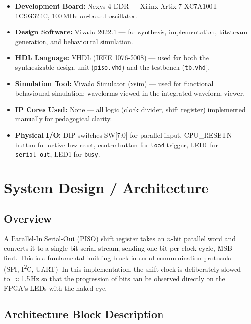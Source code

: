 \documentclass[12pt,a4paper]{report}
\begin{document}
\begin{itemize}[leftmargin=1.5em]
  \item \textbf{Development Board:} Nexys 4 DDR --- Xilinx Artix-7 XC7A100T-1CSG324C, 100\,MHz on-board oscillator.
  \item \textbf{Design Software:} Vivado 2022.1 --- for synthesis, implementation, bitstream generation, and behavioural simulation.
  \item \textbf{HDL Language:} VHDL (IEEE 1076-2008) --- used for both the synthesizable design unit (\texttt{piso.vhd}) and the testbench (\texttt{tb.vhd}).
  \item \textbf{Simulation Tool:} Vivado Simulator (xsim) --- used for functional behavioural simulation; waveforms viewed in the integrated waveform viewer.
  \item \textbf{IP Cores Used:} None --- all logic (clock divider, shift register) implemented manually for pedagogical clarity.
  \item \textbf{Physical I/O:} DIP switches SW[7:0] for parallel input, CPU\_RESETN button for active-low reset, centre button for \texttt{load} trigger, LED0 for \texttt{serial\_out}, LED1 for \texttt{busy}.
\end{itemize}

\chapter{System Design / Architecture}

\section{Overview}

A Parallel-In Serial-Out (PISO) shift register takes an $n$-bit parallel word and converts it to a single-bit serial stream, sending one bit per clock cycle, MSB first. This is a fundamental building block in serial communication protocols (SPI, I\textsuperscript{2}C, UART). In this implementation, the shift clock is deliberately slowed to $\approx$1.5\,Hz so that the progression of bits can be observed directly on the FPGA's LEDs with the naked eye.

\section{Architecture Block Description}
\end{document}
